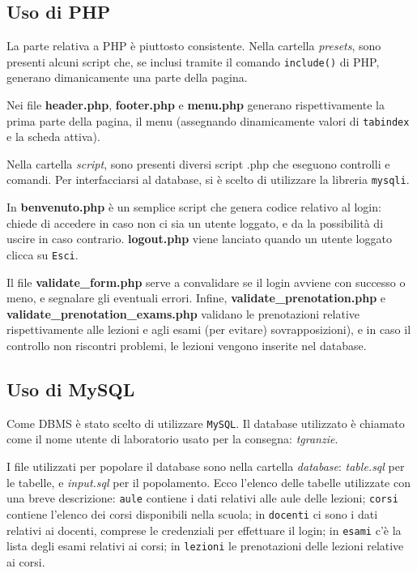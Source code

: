 \documentclass[12pt, a4paper]{article}
\begin{document}
\subsection{Uso di PHP}
La parte relativa a PHP è piuttosto consistente. Nella cartella \textit{presets}, sono presenti
alcuni script che, se inclusi tramite il comando \texttt{include()} di PHP, generano dimanicamente
una parte della pagina. \par
\smallskip
Nei file \textbf{header.php}, \textbf{footer.php} e \textbf{menu.php} generano rispettivamente la prima 
parte della pagina, il menu (assegnando dinamicamente valori di \texttt{tabindex} e la scheda attiva). \par
\smallskip
Nella cartella \textit{script}, sono presenti diversi script .php che eseguono controlli e comandi. Per interfacciarsi al database, si è scelto di utilizzare la libreria \texttt{mysqli}.\par
\smallskip
In \textbf{benvenuto.php} è un semplice script che genera codice relativo al login: chiede di accedere
in caso non ci sia un utente loggato, e da la possibilità di uscire in caso contrario. \textbf{logout.php} viene lanciato quando un utente loggato clicca su \texttt{Esci}. \par
Il file \textbf{validate\_form.php} serve a convalidare se il login avviene con successo o meno, e segnalare
gli eventuali errori. Infine, \mbox{\textbf{validate\_prenotation.php}} e \mbox{\textbf{validate\_prenotation\_exams.php}} validano le prenotazioni relative rispettivamente alle lezioni e agli esami (per 
evitare) sovrapposizioni), e in caso il controllo non riscontri problemi, le lezioni vengono inserite nel database.



\subsection{Uso di MySQL}
Come DBMS è stato scelto di utilizzare \texttt{MySQL}. Il database utilizzato è chiamato 
come il nome utente di laboratorio usato per la consegna: \textit{tgranzie}.\par 
I file utilizzati per popolare il database sono nella cartella \mbox{\textit{database}}:
\mbox{\textit{table.sql}} per le tabelle, e \mbox{\textit{input.sql}} per il popolamento. 
Ecco l'elenco delle tabelle utilizzate con una breve descrizione: \texttt{aule} contiene 
i dati relativi alle aule delle lezioni; \texttt{corsi} 
contiene l'elenco dei corsi disponibili nella scuola; in \texttt{docenti} ci sono i dati relativi 
ai docenti, comprese le credenziali per effettuare il login; in \texttt{esami} c'è la lista degli
esami relativi ai corsi; in \texttt{lezioni} le prenotazioni delle lezioni relative ai corsi.
\end{document}
